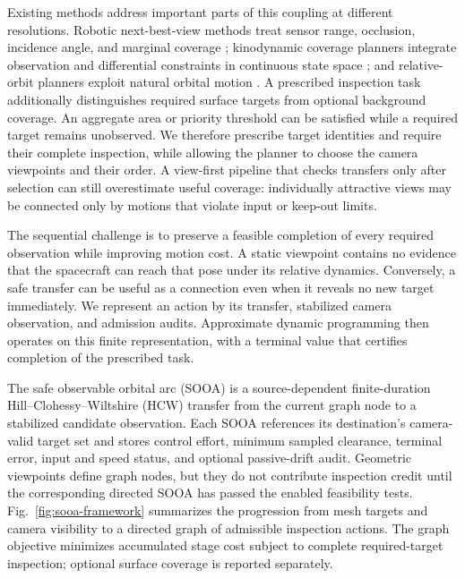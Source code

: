 \documentclass{IEEEtaes}
\theoremstyle{remark}
\theoremstyle{plain}
\begin{document}
Existing methods address important parts of this coupling at different resolutions. Robotic next-best-view methods treat sensor range, occlusion, incidence angle, and marginal coverage \cite{scott2003view}; kinodynamic coverage planners integrate observation and differential constraints in continuous state space \cite{faghihi2022kinodynamic,faghihi2023multiple}; and relative-orbit planners exploit natural orbital motion \cite{hou2024relative,deka2023astrodynamics}. A prescribed inspection task additionally distinguishes required surface targets from optional background coverage. An aggregate area or priority threshold can be satisfied while a required target remains unobserved. We therefore prescribe target identities and require their complete inspection, while allowing the planner to choose the camera viewpoints and their order. A view-first pipeline that checks transfers only after selection can still overestimate useful coverage: individually attractive views may be connected only by motions that violate input or keep-out limits.

The sequential challenge is to preserve a feasible completion of every required observation while improving motion cost. A static viewpoint contains no evidence that the spacecraft can reach that pose under its relative dynamics. Conversely, a safe transfer can be useful as a connection even when it reveals no new target immediately. We represent an action by its transfer, stabilized camera observation, and admission audits. Approximate dynamic programming then operates on this finite representation, with a terminal value that certifies completion of the prescribed task.

The safe observable orbital arc (SOOA) is a source-dependent finite-duration Hill--Clohessy--Wiltshire (HCW) transfer from the current graph node to a stabilized candidate observation. Each SOOA references its destination's camera-valid target set and stores control effort, minimum sampled clearance, terminal error, input and speed status, and optional passive-drift audit. Geometric viewpoints define graph nodes, but they do not contribute inspection credit until the corresponding directed SOOA has passed the enabled feasibility tests. Fig.~\ref{fig:sooa-framework} summarizes the progression from mesh targets and camera visibility to a directed graph of admissible inspection actions. The graph objective minimizes accumulated stage cost subject to complete required-target inspection; optional surface coverage is reported separately.
\end{document}
